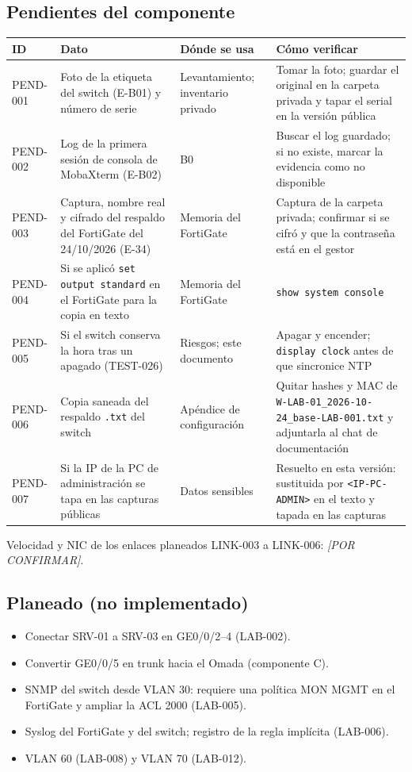 \documentclass[11pt,a4paper]{article}
\newcommand{\pc}{\textcolor{muted}{\textit{[POR CONFIRMAR]}}}
\newcommand{\cab}{\rowcolor{light}}
\newcommand{\fn}[1]{\texttt{\fnbreaks#1\fnend}}
\def\fnbreaks#1\fnend{\begingroup\fnactive\scantokens{#1\noexpand}\endgroup}
\gdef\fnactive{\catcode`\-=\active\catcode`\/=\active
  \def-{\char`\-\allowbreak}\def/{\char`\/\allowbreak}\let\_\fnus}
\newcommand{\fnus}{\textunderscore\allowbreak}
\begin{document}
\subsection{Pendientes del componente}
{\small
\begin{longtable}{L{1.6cm} L{4.7cm} L{3.6cm} L{4.8cm}}
  \toprule
  \cab\textbf{ID} & \textbf{Dato} & \textbf{Dónde se usa} & \textbf{Cómo verificar}\\
  \midrule
  \endhead
  PEND-001 & Foto de la etiqueta del switch (E-B01) y número de serie & Levantamiento; inventario privado & Tomar la foto; guardar el original en la carpeta privada y tapar el serial en la versión pública\\
  PEND-002 & Log de la primera sesión de consola de MobaXterm (E-B02) & B0 & Buscar el log guardado; si no existe, marcar la evidencia como no disponible\\
  PEND-003 & Captura, nombre real y cifrado del respaldo del FortiGate del 24/10/2026 (E-34) & Memoria del FortiGate & Captura de la carpeta privada; confirmar si se cifró y que la contraseña está en el gestor\\
  PEND-004 & Si se aplicó \texttt{set output standard} en el FortiGate para la copia en texto & Memoria del FortiGate & \texttt{show system console}\\
  PEND-005 & Si el switch conserva la hora tras un apagado (TEST-026) & Riesgos; este documento & Apagar y encender; \texttt{display clock} antes de que sincronice NTP\\
  PEND-006 & Copia saneada del respaldo \texttt{.txt} del switch & Apéndice de configuración & Quitar hashes y MAC de \fn{SW-LAB-01\_2026-10-24\_base-LAB-001.txt} y adjuntarla al chat de documentación\\
  PEND-007 & Si la IP de la PC de administración se tapa en las capturas públicas & Datos sensibles & Resuelto en esta versión: sustituida por \texttt{<IP-PC-ADMIN>} en el texto y tapada en las capturas\\
  \bottomrule
\end{longtable}
}

Velocidad y NIC de los enlaces planeados LINK-003 a LINK-006: \pc.

\subsection{Planeado (no implementado)}
\begin{itemize}
  \item Conectar SRV-01 a SRV-03 en GE0/0/2--4 (LAB-002).
  \item Convertir GE0/0/5 en trunk hacia el Omada (componente C).
  \item SNMP del switch desde VLAN 30: requiere una política MON \textrightarrow{} MGMT en el FortiGate y ampliar la ACL 2000 (LAB-005).
  \item Syslog del FortiGate y del switch; registro de la regla implícita (LAB-006).
  \item VLAN 60 (LAB-008) y VLAN 70 (LAB-012).
\end{itemize}
\end{document}
